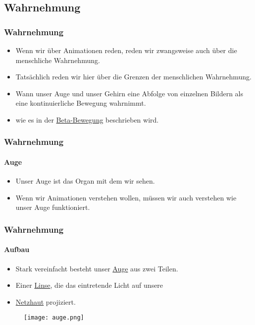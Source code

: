 \subsection{Wahrnehmung}

\begin{frame}
    \frametitle{Wahrnehmung}
    \begin{itemize}
        \item Wenn wir über Animationen reden, reden wir zwangsweise auch über die menschliche Wahrnehmung.
        \item Tatsächlich reden wir hier über die Grenzen der menschlichen Wahrnehmung.
        \item Wann unser Auge und unser Gehirn eine Abfolge von einzelnen Bildern als eine kontinuierliche Bewegung wahrnimmt.
        \item wie es in der \href{https://de.wikipedia.org/wiki/Beta-Bewegung}{Beta-Bewegung} beschrieben wird.
    \end{itemize}
\end{frame}

\begin{frame}
    \frametitle{Wahrnehmung}
    \framesubtitle{Auge}
    \begin{itemize}
        \item Unser Auge ist das Organ mit dem wir sehen.
        \item Wenn wir Animationen verstehen wollen, müssen wir auch verstehen wie unser Auge funktioniert.
    \end{itemize}
\end{frame}

\begin{frame}
    \frametitle{Wahrnehmung}
    \framesubtitle{Aufbau}
    \begin{minipage}{0.5\textwidth}
        \begin{itemize}
            \item Stark vereinfacht besteht unser \href{https://de.wikipedia.org/wiki/Auge\#Augapfel}{Auge} aus zwei Teilen.
            \item Einer \href{https://de.wikipedia.org/wiki/Linse_(Auge)}{Linse}, die das eintretende Licht auf unsere
            \item \href{https://de.wikipedia.org/wiki/Netzhaut}{Netzhaut} projiziert.
        \end{itemize}
    \end{minipage} \hfill
    \begin{minipage}{0.45\textwidth}
        \begin{figure}
            \texttt{[image: auge.png]}
        \end{figure}
    \end{minipage}
\end{frame}

